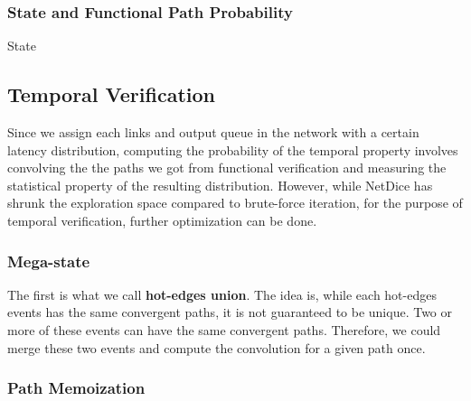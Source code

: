 \documentclass[10pt,sigconf,letterpaper,anonymous,nonacm]{acmart}
\begin{document}
\subsubsection{State and Functional Path Probability}
State 

\subsection{Temporal Verification}
Since we assign each links and output queue in the network with a certain latency distribution, 
computing the probability of the temporal property involves convolving the the paths we got from 
functional verification and measuring the statistical property of the resulting distribution.
However, while NetDice has shrunk the exploration space compared to brute-force iteration, for
the purpose of temporal verification, further optimization can be done.

\subsubsection{Mega-state}
The first is what we call \textbf{hot-edges union}. 
The idea is, while each hot-edges events has the same convergent paths, it is not guaranteed to be 
unique. 
Two or more of these events can have the same convergent paths.
Therefore, we could merge these two events and compute the convolution for a given path once.

\subsubsection{Path Memoization}


\end{document}
